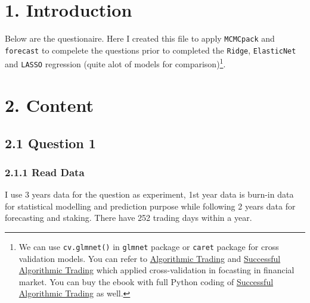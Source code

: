 \documentclass[]{tufte-book}
\author{\href{https://englianhu.github.io/}{{®γσ, Lian Hu}} 白戸則道®}
\date{2017-09-14}
\begin{document}
\chapter{1. Introduction}\label{introduction}

Below are the questionaire. Here I created this file to apply
\texttt{MCMCpack} and \texttt{forecast} to compelete the questions prior
to completed the \texttt{Ridge}, \texttt{ElasticNet} and \texttt{LASSO}
regression (quite alot of models for comparison)\footnote{We can use
  \texttt{cv.glmnet()} in \texttt{glmnet} package or \texttt{caret}
  package for cross validation models. You can refer to
  \href{https://robotwealth.com/caterory/algorithmic-trading/page/4/}{{Algorithmic
  Trading}} and
  \href{https://raw.githubusercontent.com/englianhu/binary.com-interview-question/fcad2844d7f10c486f3601af9932f49973548e4b/reference/Successful\%20Algorithmic\%20Trading.pdf}{{Successful
  Algorithmic Trading}} which applied cross-validation in focasting in
  financial market. You can buy the ebook with full Python coding of
  \href{https://www.quantstart.com/successful-algorithmic-trading-ebook}{{Successful
  Algorithmic Trading}} as well.}.

\chapter{2. Content}\label{content}

\section{2.1 Question 1}\label{question-1}

\subsection{2.1.1 Read Data}\label{read-data}

I use 3 years data for the question as experiment, 1st year data is
burn-in data for statistical modelling and prediction purpose while
following 2 years data for forecasting and staking. There have 252
trading days within a year.
\end{document}
